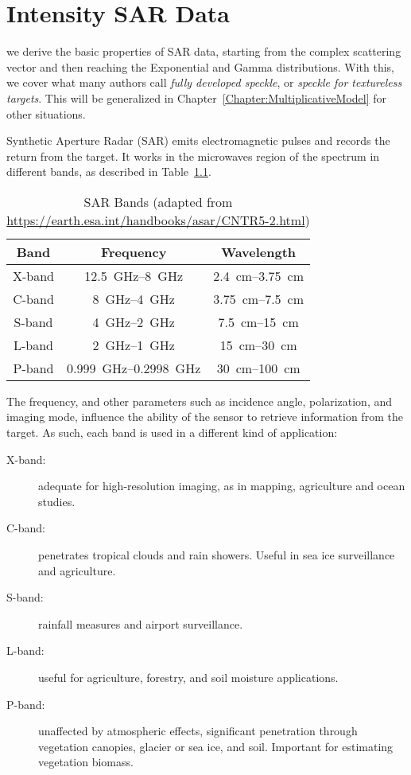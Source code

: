 \chapter{Intensity SAR Data}\label{Chapter:DataFormation}

 we derive the basic properties of SAR data, starting from the complex scattering vector and then reaching the Exponential and Gamma distributions.
With this, we cover what many authors call \textit{fully developed speckle}, or \textit{speckle for textureless targets}.
This will be generalized in Chapter~\ref{Chapter:MultiplicativeModel} for other situations.

Synthetic Aperture Radar (SAR) emits electromagnetic pulses and records the return from the target.
It works in the microwaves region of the spectrum in different bands, as described in Table~\ref{Tab:Bands}.

\begin{table}[hbt]
\caption{SAR Bands (adapted from \url{https://earth.esa.int/handbooks/asar/CNTR5-2.html})}\label{Tab:Bands}
\centering
\begin{tabular}{ccc}
\toprule
\textbf{Band}	& \textbf{Frequency}			& \textbf{Wavelength} \\ \midrule
X-band			& \SIrange[range-units = single]{12.5}{8}{\GHz}	& \SIrange[range-units = single]{2.4}{3.75}{\cm} \\
C-band			& \SIrange[range-units = single]{8}{4}{\GHz} 			& \SIrange[range-units = single]{3.75}{7.5}{\cm}\\
S-band			& \SIrange[range-units = single]{4}{2}{\GHz}	& \SIrange[range-units = single]{7.5}{15}{\cm} \\
L-band			& \SIrange[range-units = single]{2}{1}{\GHz}	& \SIrange[range-units = single]{15}{30}{\cm} \\
P-band			& \SIrange[range-units = single]{0.999}{0.2998}{\GHz}	& \SIrange[range-units = single]{30}{100}{\cm} \\
\bottomrule
\end{tabular}
\end{table}

The frequency, and other parameters such as incidence angle, polarization, and imaging mode, influence the ability of the sensor to retrieve information from the target.
As such, each band is used in a different kind of application:
\begin{description}
\item[X-band:] adequate for high-resolution imaging, as in mapping, agriculture and ocean studies.
\item[C-band:] penetrates tropical clouds and rain showers. Useful in sea ice surveillance and agriculture.
\item[S-band:] rainfall measures and airport surveillance.
\item[L-band:] useful for agriculture, forestry, and soil moisture applications.
\item[P-band:] unaffected by atmospheric effects, significant penetration through vegetation canopies, glacier or sea ice, and soil. Important for estimating vegetation biomass.
\end{description}

